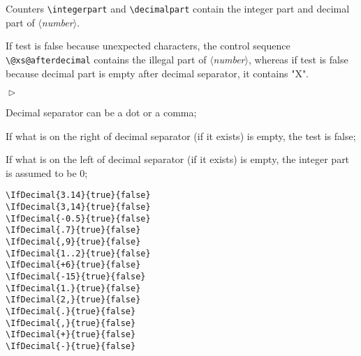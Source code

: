 \documentclass[a4paper,10pt]{article}
\newcommand\argu[1]{$\langle$\textit{#1}$\rangle$}
\newenvironment{Conditions}[1][1cm]%
{\begin{list}%
	{$\vartriangleright$}%
	{\setlength{\leftmargin}{#1}
	 \setlength{\itemsep}{0pt}
	 \setlength{\parsep}{0pt}
	 \setlength{\topsep}{2ptplus3ptminus2pt}
	}}%
{\end{list}}
\newcommand\styleexemple{\small\vskip4pt}
\newcommand\verbinline{\lstinline[basicstyle=\normalsize\ttfamily]}
\begin{document}
Counters \verbinline|\integerpart| and \verbinline|\decimalpart| contain the integer part and decimal part of \argu{number}.

If test is false because unexpected characters, the control sequence \verbinline|\@xs@afterdecimal| contains the illegal part of \argu{number}, whereas if test is false because decimal part is empty after decimal separator, it contains "X".\medskip

\begin{Conditions}
	\item Decimal separator can be a dot or a comma;
	\item If what is on the right of decimal separator (if it exists) is empty, the test is false;
	\item If what is on the left of decimal separator (if it exists) is empty, the integer part is assumed to be 0;
\end{Conditions}

\begin{minipage}[t]{0.65\linewidth}
\begin{lstlisting}
\IfDecimal{3.14}{true}{false}
\IfDecimal{3,14}{true}{false}
\IfDecimal{-0.5}{true}{false}
\IfDecimal{.7}{true}{false}
\IfDecimal{,9}{true}{false}
\IfDecimal{1..2}{true}{false}
\IfDecimal{+6}{true}{false}
\IfDecimal{-15}{true}{false}
\IfDecimal{1.}{true}{false}
\IfDecimal{2,}{true}{false}
\IfDecimal{.}{true}{false}
\IfDecimal{,}{true}{false}
\IfDecimal{+}{true}{false}
\IfDecimal{-}{true}{false}
\end{lstlisting}%
\end{minipage}\hfill
\begin{minipage}[t]{0.35\linewidth}
	\styleexemple
	\par
	\par
	\par
	\par
	\par
	\par
	\par
	\par
	\par
	\par
	\par
	\par
	\par
\end{minipage}%
\end{document}

